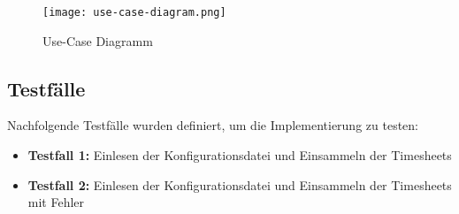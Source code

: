\begin{figure}[H]
    \centering
    \texttt{[image: use-case-diagram.png]}
    \caption{Use-Case Diagramm}
    \label{fig:use-case-diagram}
\end{figure}



\subsection{Testfälle}
Nachfolgende Testfälle wurden definiert, um die Implementierung zu testen:
\begin{itemize}
\item \textbf{Testfall 1:} Einlesen der Konfigurationsdatei und Einsammeln der Timesheets
\item \textbf{Testfall 2:} Einlesen der Konfigurationsdatei und Einsammeln der Timesheets mit Fehler
\end{itemize}